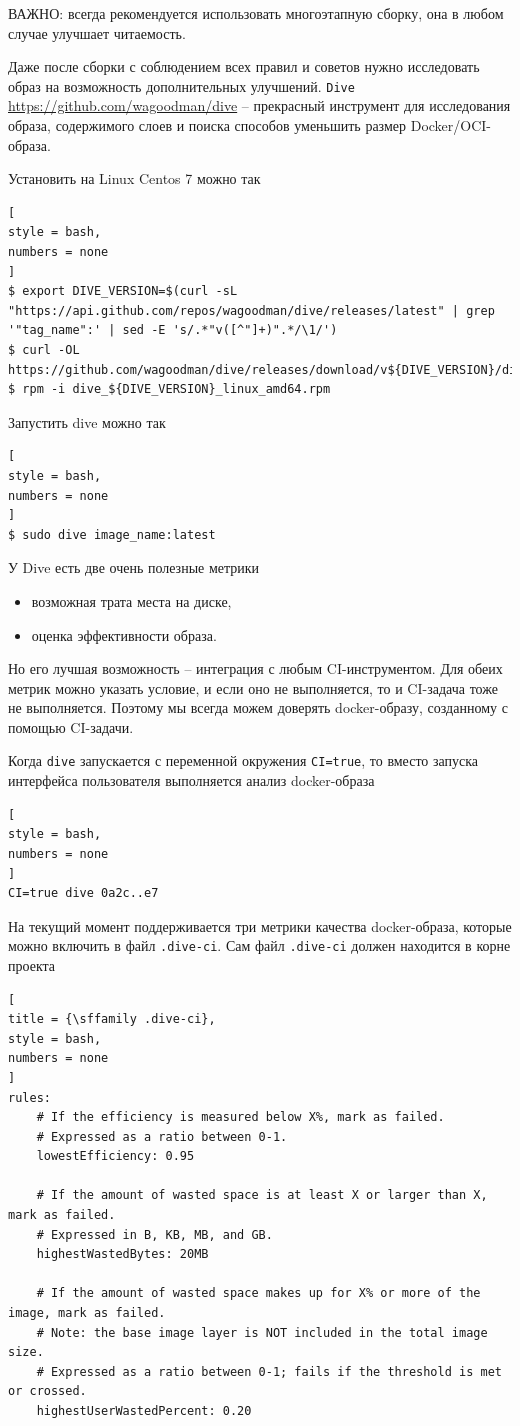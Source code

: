 \documentclass[%
	11pt,
	a4paper,
	utf8,
		]{article}
\begin{document}
ВАЖНО: всегда рекомендуется использовать многоэтапную сборку, она в любом случае улучшает читаемость.

Даже после сборки с соблюдением всех правил и советов нужно исследовать образ на возможность дополнительных улучшений. \texttt{Dive} \url{https://github.com/wagoodman/dive} -- прекрасный инструмент для исследования образа, содержимого слоев и поиска способов уменьшить размер Docker/OCI-образа.

Установить на Linux Centos 7 можно так
\begin{lstlisting}[
style = bash,
numbers = none
]
$ export DIVE_VERSION=$(curl -sL "https://api.github.com/repos/wagoodman/dive/releases/latest" | grep '"tag_name":' | sed -E 's/.*"v([^"]+)".*/\1/')
$ curl -OL https://github.com/wagoodman/dive/releases/download/v${DIVE_VERSION}/dive_${DIVE_VERSION}_linux_amd64.rpm
$ rpm -i dive_${DIVE_VERSION}_linux_amd64.rpm
\end{lstlisting}

Запустить dive можно так
\begin{lstlisting}[
style = bash,
numbers = none
]
$ sudo dive image_name:latest
\end{lstlisting}

У Dive есть две очень полезные метрики
\begin{itemize}
	\item возможная трата места на диске,
	
	\item оценка эффективности образа.
\end{itemize}

Но его лучшая возможность -- интеграция с любым CI-инструментом. Для обеих метрик можно указать условие, и если оно не выполняется, то и CI-задача тоже не выполняется. Поэтому мы всегда можем доверять docker-образу, созданному с помощью CI-задачи.

Когда \texttt{dive} запускается с переменной окружения \texttt{CI=true}, то вместо запуска интерфейса пользователя выполняется анализ docker-образа

\begin{lstlisting}[
style = bash,
numbers = none	
]
CI=true dive 0a2c..e7
\end{lstlisting}

На текущий момент поддерживается три метрики качества docker-образа, которые можно включить в файл \texttt{.dive-ci}. Сам файл \texttt{.dive-ci} должен находится в корне проекта
\begin{lstlisting}[
title = {\sffamily .dive-ci},
style = bash,
numbers = none	
]
rules:
	# If the efficiency is measured below X%, mark as failed.
	# Expressed as a ratio between 0-1.
	lowestEfficiency: 0.95

	# If the amount of wasted space is at least X or larger than X, mark as failed.
	# Expressed in B, KB, MB, and GB.
	highestWastedBytes: 20MB

	# If the amount of wasted space makes up for X% or more of the image, mark as failed.
	# Note: the base image layer is NOT included in the total image size.
	# Expressed as a ratio between 0-1; fails if the threshold is met or crossed.
	highestUserWastedPercent: 0.20
\end{lstlisting} 
\end{document}
